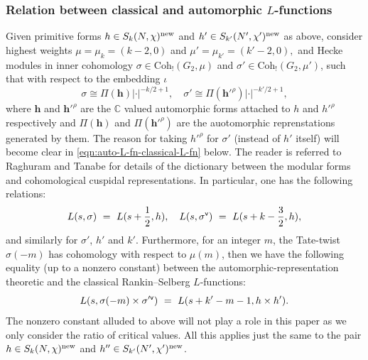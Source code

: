 \documentclass[11pt]{amsart}
\newcommand{\C}{\mathbb C}
\begin{document}
\subsubsection{Relation between classical and automorphic $L$-functions} \label{section: relation-between-classical-and-automorphic-l-functions}
Given primitive forms $h \in S_k(N,\chi)^{\textup{new}}$ and $h' \in S_{k'}(N',\chi')^{\textup{new}}$ as above, 
consider highest weights  
$\mu = \mu_k = (k-2,0)$ and $\mu' = \mu_{k'} = (k'-2,0),$ and Hecke modules in inner cohomology 
$\sigma \in \text{Coh}_!(G_2, \mu)$ and $\sigma' \in \text{Coh}_!(G_2,\mu')$, such that with respect to the embedding $\iota$
\begin{equation}
\label{eqn:choice-of-repns}
\sigma \cong \Pi(\mathbf{h})|\cdot|^{-k/2+1}, \quad \sigma' \cong \Pi(\mathbf{h}'^\rho)|\cdot|^{-k'/2+1}, 
\end{equation}
where $\mathbf{h}$  and $\mathbf{h}'^\rho$ are the $\C$ valued automorphic forms attached to $h$ and $h'^\rho$ respectively and $\Pi(\mathbf{h})$ and $\Pi(\mathbf{h}'^\rho)$ are the auotomorphic reprenstations generated by them. 
The reason for taking $h'^\rho$ for $\sigma'$ (instead of $h'$ itself) will become clear in \eqref{eqn:auto-L-fn-classical-L-fn} below. 
The reader is referred to Raghuram and Tanabe \cite{raghuram-tanabe} for details of the dictionary between the modular forms and cohomological cuspidal representations. 
In particular, one has the following relations: 
$$
L(s, \sigma) \ = \ L(s+ \frac12, h), \quad L(s, \sigma^{\sf v}) \ = \ L(s+ k - \frac32, h), 
$$ 
and similarly for $\sigma'$, $h'$ and $k'$. Furthermore, for an integer $m$, the Tate-twist $\sigma(-m)$ has cohomology with respect to $\mu(m)$, 
then we have the following equality (up to a nonzero constant) between the automorphic-representation theoretic and the classical 
Rankin--Selberg $L$-functions:
\begin{equation}
\label{eqn:auto-L-fn-classical-L-fn}
L(s, \sigma(-m) \times  \sigma'^{\sf v}) \ = \ L(s + k' -m -1, h \times h').
\end{equation}
The nonzero constant alluded to above will not play a role in this paper as we only consider the ratio of critical values. 
All this applies just the same to the pair $h \in S_k(N,\chi)^{\textup{new}}$ and $h'' \in S_{k'}(N',\chi')^{\textup{new}}$. 


\medskip
\end{document}
